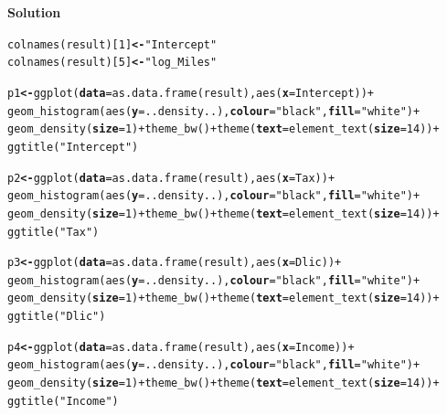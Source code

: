 \documentclass[12pt,oneside,a4paper]{article}\usepackage[]{graphicx}\usepackage[]{xcolor}
\makeatletter
\newcommand{\hlnum}[1]{\textcolor[rgb]{0,0,0}{#1}}%
\newcommand{\hlstr}[1]{\textcolor[rgb]{0,0,1}{#1}}%
\newcommand{\hlopt}[1]{\textcolor[rgb]{0,0,0}{#1}}%
\newcommand{\hlstd}[1]{\textcolor[rgb]{0,0,0}{#1}}%
\newcommand{\hlkwb}[1]{\textcolor[rgb]{0.498,0,0.333}{\textbf{#1}}}%
\newcommand{\hlkwc}[1]{\textcolor[rgb]{0.498,0,0.333}{\textbf{#1}}}%
\newcommand{\hlkwd}[1]{\textcolor[rgb]{0,0,0}{#1}}%
\newenvironment{kframe}{%
 \def\at@end@of@kframe{}%
 \ifinner\ifhmode%
  \def\at@end@of@kframe{\end{minipage}}%
  \begin{minipage}{\columnwidth}%
 \fi\fi%
 \def\FrameCommand##1{\hskip\@totalleftmargin \hskip-\fboxsep
 \colorbox{shadecolor}{##1}\hskip-\fboxsep
     \hskip-\linewidth \hskip-\@totalleftmargin \hskip\columnwidth}%
 \MakeFramed {\advance\hsize-\width
   \@totalleftmargin\z@ \linewidth\hsize
   \@setminipage}}%
 {\par\unskip\endMakeFramed%
 \at@end@of@kframe}
\newenvironment{knitrout}{}{} %
\newcommand{\solution}
{
    \vspace{15pt}
    \noindent\ignorespaces\textbf{\large Solution}\par
}
\makeatother
\begin{document}
\solution
\begin{knitrout}
\color{fgcolor}\begin{kframe}
\begin{alltt}
\hlkwd{colnames}\hlstd{(result)[}\hlnum{1}\hlstd{]} \hlkwb{<-} \hlstr{"Intercept"}
\hlkwd{colnames}\hlstd{(result)[}\hlnum{5}\hlstd{]} \hlkwb{<-} \hlstr{"log_Miles"}

\hlstd{p1} \hlkwb{<-} \hlkwd{ggplot}\hlstd{(}\hlkwc{data} \hlstd{=} \hlkwd{as.data.frame}\hlstd{(result),} \hlkwd{aes}\hlstd{(}\hlkwc{x} \hlstd{= Intercept))} \hlopt{+}
    \hlkwd{geom_histogram}\hlstd{(}\hlkwd{aes}\hlstd{(}\hlkwc{y} \hlstd{= ..density..),} \hlkwc{colour} \hlstd{=} \hlstr{"black"}\hlstd{,} \hlkwc{fill} \hlstd{=} \hlstr{"white"}\hlstd{)} \hlopt{+}
    \hlkwd{geom_density}\hlstd{(}\hlkwc{size} \hlstd{=} \hlnum{1}\hlstd{)} \hlopt{+} \hlkwd{theme_bw}\hlstd{()} \hlopt{+} \hlkwd{theme}\hlstd{(}\hlkwc{text} \hlstd{=} \hlkwd{element_text}\hlstd{(}\hlkwc{size} \hlstd{=} \hlnum{14}\hlstd{))} \hlopt{+}
    \hlkwd{ggtitle}\hlstd{(}\hlstr{"Intercept"}\hlstd{)}

\hlstd{p2} \hlkwb{<-} \hlkwd{ggplot}\hlstd{(}\hlkwc{data} \hlstd{=} \hlkwd{as.data.frame}\hlstd{(result),} \hlkwd{aes}\hlstd{(}\hlkwc{x} \hlstd{= Tax))} \hlopt{+}
    \hlkwd{geom_histogram}\hlstd{(}\hlkwd{aes}\hlstd{(}\hlkwc{y} \hlstd{= ..density..),} \hlkwc{colour} \hlstd{=} \hlstr{"black"}\hlstd{,} \hlkwc{fill} \hlstd{=} \hlstr{"white"}\hlstd{)} \hlopt{+}
    \hlkwd{geom_density}\hlstd{(}\hlkwc{size} \hlstd{=} \hlnum{1}\hlstd{)} \hlopt{+} \hlkwd{theme_bw}\hlstd{()} \hlopt{+} \hlkwd{theme}\hlstd{(}\hlkwc{text} \hlstd{=} \hlkwd{element_text}\hlstd{(}\hlkwc{size} \hlstd{=} \hlnum{14}\hlstd{))} \hlopt{+}
    \hlkwd{ggtitle}\hlstd{(}\hlstr{"Tax"}\hlstd{)}

\hlstd{p3} \hlkwb{<-} \hlkwd{ggplot}\hlstd{(}\hlkwc{data} \hlstd{=} \hlkwd{as.data.frame}\hlstd{(result),} \hlkwd{aes}\hlstd{(}\hlkwc{x} \hlstd{= Dlic))} \hlopt{+}
    \hlkwd{geom_histogram}\hlstd{(}\hlkwd{aes}\hlstd{(}\hlkwc{y} \hlstd{= ..density..),} \hlkwc{colour} \hlstd{=} \hlstr{"black"}\hlstd{,} \hlkwc{fill} \hlstd{=} \hlstr{"white"}\hlstd{)} \hlopt{+}
    \hlkwd{geom_density}\hlstd{(}\hlkwc{size} \hlstd{=} \hlnum{1}\hlstd{)} \hlopt{+} \hlkwd{theme_bw}\hlstd{()} \hlopt{+} \hlkwd{theme}\hlstd{(}\hlkwc{text} \hlstd{=} \hlkwd{element_text}\hlstd{(}\hlkwc{size} \hlstd{=} \hlnum{14}\hlstd{))} \hlopt{+}
    \hlkwd{ggtitle}\hlstd{(}\hlstr{"Dlic"}\hlstd{)}

\hlstd{p4} \hlkwb{<-} \hlkwd{ggplot}\hlstd{(}\hlkwc{data} \hlstd{=} \hlkwd{as.data.frame}\hlstd{(result),} \hlkwd{aes}\hlstd{(}\hlkwc{x} \hlstd{= Income))} \hlopt{+}
    \hlkwd{geom_histogram}\hlstd{(}\hlkwd{aes}\hlstd{(}\hlkwc{y} \hlstd{= ..density..),} \hlkwc{colour} \hlstd{=} \hlstr{"black"}\hlstd{,} \hlkwc{fill} \hlstd{=} \hlstr{"white"}\hlstd{)} \hlopt{+}
    \hlkwd{geom_density}\hlstd{(}\hlkwc{size} \hlstd{=} \hlnum{1}\hlstd{)} \hlopt{+} \hlkwd{theme_bw}\hlstd{()} \hlopt{+} \hlkwd{theme}\hlstd{(}\hlkwc{text} \hlstd{=} \hlkwd{element_text}\hlstd{(}\hlkwc{size} \hlstd{=} \hlnum{14}\hlstd{))} \hlopt{+}
    \hlkwd{ggtitle}\hlstd{(}\hlstr{"Income"}\hlstd{)}


\end{alltt}
\end{kframe}
\end{knitrout}
\end{document}
